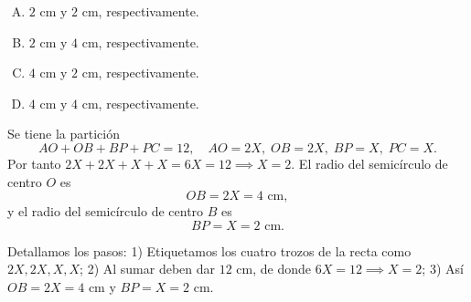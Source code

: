 \begin{question}
\begin{center}
\begin{tikzpicture}[scale=0.5]
\end{tikzpicture}
\end{center}

\begin{enumerate}[A)]
\item $2\text{ cm}$ y $2\text{ cm}$, respectivamente.
\item $2\text{ cm}$ y $4\text{ cm}$, respectivamente.
\item $4\text{ cm}$ y $2\text{ cm}$, respectivamente.
\item $4\text{ cm}$ y $4\text{ cm}$, respectivamente.
\end{enumerate}
\end{question}

\begin{solution}
Se tiene la partición
\[
AO + OB + BP + PC = 12,\quad
AO=2X,\;OB=2X,\;BP=X,\;PC=X.
\]
Por tanto $2X+2X+X+X=6X=12\implies X=2$. El radio del semicírculo de centro $O$ es
\[
OB=2X=4\text{ cm},
\]
y el radio del semicírculo de centro $B$ es
\[
BP=X=2\text{ cm}.
\]
\end{solution}

\begin{explanations}
Detallamos los pasos:
1) Etiquetamos los cuatro trozos de la recta como $2X,2X,X,X$;
2) Al sumar deben dar $12$ cm, de donde $6X=12\implies X=2$;
3) Así $OB=2X=4$ cm y $BP=X=2$ cm.
\end{explanations}
